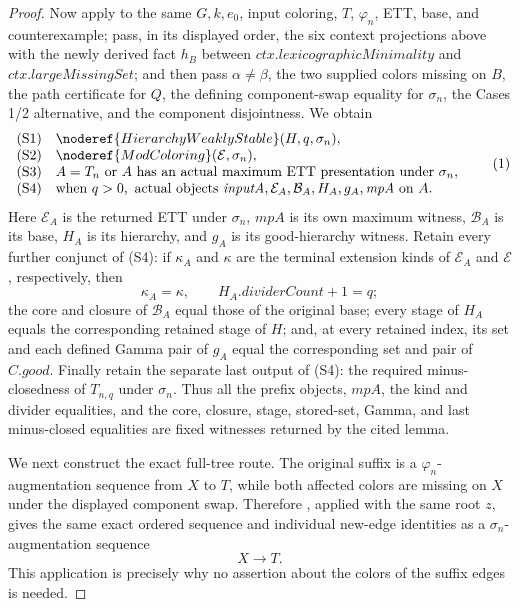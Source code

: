 \begin{proof}
Now apply  to the same
\(G,k,e_0\), input coloring, \(T\), \(\varphi_n\), ETT, base, and
counterexample; pass, in its displayed order, the six context projections
above with the newly derived fact \(h_B\) between
\(\mathit{ctx.lexicographicMinimality}\) and
\(\mathit{ctx.largeMissingSet}\); and then pass \(\alpha\ne\beta\), the
two supplied colors missing on \(B\), the path certificate for \(Q\), the
defining component-swap equality for \(\sigma_n\), the Cases 1/2
alternative, and the component disjointness.  We obtain
\[
\begin{array}{ll}
\text{(S1)}&\noderef{HierarchyWeaklyStable}(H,q,\sigma_n),\\
\text{(S2)}&\noderef{ModColoring}(\mathcal E,\sigma_n),\\
\text{(S3)}&A=T_n\text{ or }A\text{ has an actual maximum ETT
 presentation under }\sigma_n,\\
\text{(S4)}&\text{when }q>0,\text{ actual objects }
 \mathit{inputA},\mathcal E_A,\mathcal B_A,H_A,g_A,\mathit{mpA}
 \text{ on }A.
\end{array}                                                       \tag{1}
\]
Here \(\mathcal E_A\) is the returned ETT under \(\sigma_n\),
\(\mathit{mpA}\) is its own maximum witness, \(\mathcal B_A\) is its
base, \(H_A\) is its hierarchy, and \(g_A\) is its good-hierarchy
witness.  Retain every further conjunct of (S4): if \(\kappa_A\) and
\(\kappa\) are the terminal extension kinds of \(\mathcal E_A\) and
\(\mathcal E\), respectively, then
\[
 \kappa_A=\kappa,\qquad H_A.\mathit{dividerCount}+1=q;             \tag{1a}
\]
the core and closure of \(\mathcal B_A\) equal those of the original
base; every stage of \(H_A\) equals the corresponding retained stage of
\(H\); and, at every retained index, its
 set and each defined Gamma pair of
\(g_A\) equal the corresponding set and pair of \(C.\mathit{good}\).
Finally retain the separate last output of (S4): the required
minus-closedness of \(T_{n,q}\) under \(\sigma_n\).  Thus all the prefix
objects, \(\mathit{mpA}\), the kind and divider equalities, and the
core, closure, stage, stored-set, Gamma, and last minus-closed equalities
are fixed witnesses returned by the cited lemma.

We next construct the exact full-tree route.  The original suffix is a
\(\varphi_n\)-augmentation sequence from \(X\) to \(T\), while both
affected colors are missing on \(X\) under the displayed component swap.
Therefore
, applied with the
same root \(z\), gives the same exact ordered sequence and individual
new-edge identities as a \(\sigma_n\)-augmentation sequence
\[
                         X\longrightarrow T.                 \tag{2}
\]
This application is precisely why no assertion about the colors of the
suffix edges is needed.


\end{proof}
